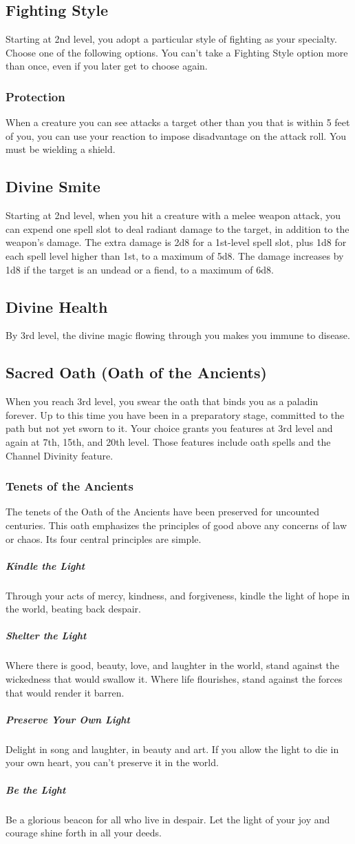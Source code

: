 \documentclass[letterpaper,openany,oneside,twocolumn]{book}
\begin{document}
\subsection*{Fighting Style}
Starting at 2nd level, you adopt a particular style of fighting as your specialty. Choose one of the following options. You can't take a Fighting Style option more than once, even if you later get to choose again.
\subsubsection*{Protection}
When a creature you can see attacks a target other than you that is within 5 feet of you, you can use your reaction to impose disadvantage on the attack roll. You must be wielding a shield.
\subsection*{Divine Smite}
Starting at 2nd level, when you hit a creature with a melee weapon attack, you can expend one spell slot to deal radiant damage to the target, in addition to the weapon's damage. The extra damage is 2d8 for a 1st-level spell slot, plus 1d8 for each spell level higher than 1st, to a maximum of 5d8. The damage increases by 1d8 if the target is an undead or a fiend, to a maximum of 6d8.
\subsection*{Divine Health}
By 3rd level, the divine magic flowing through you makes you immune to disease.
\subsection*{Sacred Oath (Oath of the Ancients)}
When you reach 3rd level, you swear the oath that binds you as a paladin forever. Up to this time you have been in a preparatory stage, committed to the path but not yet sworn to it. Your choice grants you features at 3rd level and again at 7th, 15th, and 20th level. Those features include oath spells and the Channel Divinity feature.
\subsubsection*{Tenets of the Ancients}
The tenets of the Oath of the Ancients have been preserved for uncounted centuries. This oath emphasizes the principles of good above any concerns of law or chaos. Its four central principles are simple.
\subparagraph*{Kindle the Light}
Through your acts of mercy, kindness, and forgiveness, kindle the light of hope in the world, beating back despair.
\subparagraph*{Shelter the Light}
Where there is good, beauty, love, and laughter in the world, stand against the wickedness that would swallow it. Where life flourishes, stand against the forces that would render it barren.
\subparagraph*{Preserve Your Own Light}
Delight in song and laughter, in beauty and art. If you allow the light to die in your own heart, you can't preserve it in the world.
\subparagraph*{Be the Light}
Be a glorious beacon for all who live in despair. Let the light of your joy and courage shine forth in all your deeds.
\end{document}
